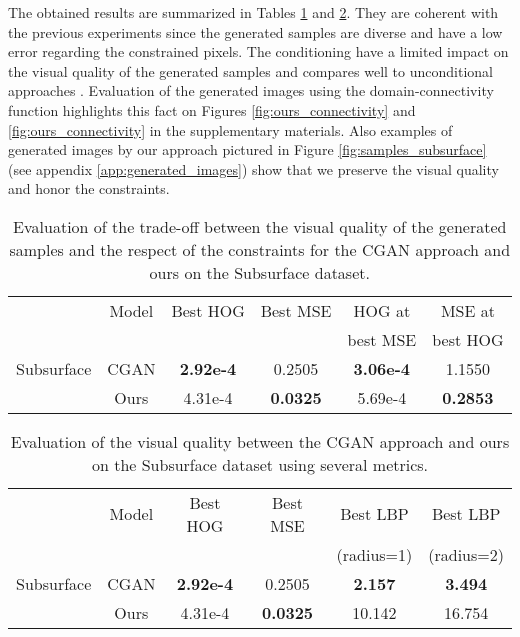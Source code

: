 The obtained results are summarized in Tables \ref{tab:subsurface} and \ref{tab:subsurface_visual}. They are coherent with the previous experiments since the generated samples are diverse and have a low error regarding the constrained pixels. The conditioning have a limited impact on the visual quality of the generated samples and compares well to unconditional approaches \citep{Ruffino2019}. Evaluation of the generated images using the domain-connectivity function highlights this fact on Figures \ref{fig:ours_connectivity} and \ref{fig:ours_connectivity} in the supplementary materials. Also examples of generated images by our approach  pictured in Figure \ref{fig:samples_subsurface} (see appendix \ref{app:generated_images}) show that we preserve the visual quality and honor the constraints.

\begin{table}
	\centering
	\begin{tabular}{|l|c|c|c|c|c|}
		\hline
		&Model           & Best HOG & Best MSE& HOG at & MSE at \\
		&&& &  best MSE & best HOG \\
		\hline
		Subsurface &CGAN   & \textbf{2.92e-4} & 0.2505 & \textbf{3.06e-4}  & 1.1550 \\
		&Ours            & 4.31e-4 & \textbf{0.0325}& 5.69e-4 & \textbf{0.2853} \\
		\hline
	\end{tabular}
	\caption{Evaluation of the trade-off between the visual quality of the generated samples and the respect of the constraints for the CGAN approach and ours on the Subsurface dataset.}
	\label{tab:subsurface}
\end{table}

\begin{table}[h]
	\centering
	\begin{tabular}{|l|c|c|c|c|c|}
		\hline
		&Model           & Best HOG & Best MSE& Best LBP & Best LBP \\
		&&& & (radius=1) & (radius=2) \\
		\hline
		Subsurface &CGAN   & \textbf{2.92e-4} & 0.2505 & \textbf{2.157} & \textbf{3.494}\\
		&Ours            &  4.31e-4 &\textbf{0.0325} & 10.142 & 16.754 \\
		\hline
	\end{tabular}
	\caption{Evaluation of the visual quality between the CGAN approach and ours on the Subsurface dataset using several metrics.}
	\label{tab:subsurface_visual}
\end{table}




